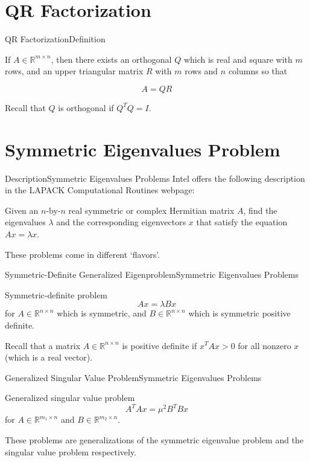 \documentclass{beamer}
\begin{document}
\section{QR Factorization}
\begin{frame}{QR Factorization}{Definition}
\begin{definition}
If $A \in \mathbb{R}^{m \times n}$, then there exists an orthogonal $Q$ which is real and square with $m$ rows, and an upper triangular matrix $R$ with $m$ rows and $n$ columns so that

\[A = QR\]
\end{definition}
\pause

Recall that $Q$ is orthogonal if $Q^T Q = I$.
\end{frame}

\section{Symmetric Eigenvalues Problem}

\begin{frame}{Description}{Symmetric Eigenvalues Problems}
Intel offers the following description in the LAPACK Computational Routines webpage:

\begin{definition}
Given an $n$-by-$n$ real symmetric or complex Hermitian matrix $A$, find the eigenvalues $\lambda$ and the corresponding eigenvectors $x$ that satisfy the equation $Ax = \lambda x$.
\end{definition}
\pause

These problems come in different `flavors'.
\end{frame}

\begin{frame}{Symmetric-Definite Generalized Eigenproblem}{Symmetric Eigenvalues Problems}

\begin{block}{Symmetric-definite problem}
\[Ax = \lambda B x\]
for $A \in \mathbb{R}^{n \times n}$ which is symmetric, and $B \in \mathbb{R}^{n \times n}$ which is symmetric positive definite.
\end{block}

\pause

Recall that a matrix $A \in \mathbb{R}^{n \times n}$ is positive definite if $x^T Ax > 0$ for all nonzero $x$ (which is a real vector).
\end{frame}

\begin{frame}{Generalized Singular Value Problem}{Symmetric Eigenvalues Problems}
\begin{block}{Generalized singular value problem}
\[A^T Ax = \mu^2 B^T Bx\]
for $A \in \mathbb{R}^{m_1 \times n}$ and $B \in \mathbb{R}^{m_2 \times n}$.
\end{block}
\pause
These problems are generalizations of the symmetric eigenvalue problem and the singular value problem respectively.
\end{frame}
\end{document}

